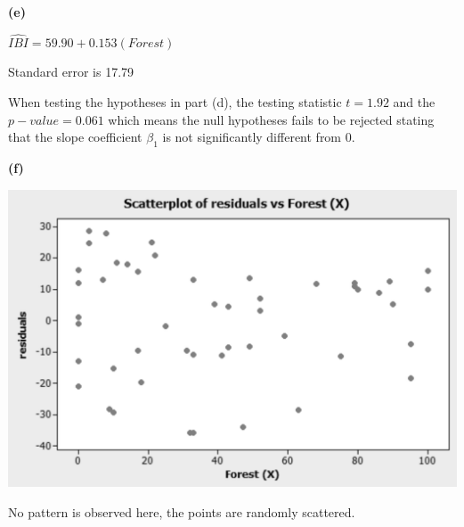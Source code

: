 \documentclass[11pt]{article}
\renewcommand\part[1]{\vspace{.10in}\textbf{(#1)}\par}
\begin{document}
	\part{e}
		$\hat{IBI}=59.90 + 0.153(Forest)$\par
		Standard error is 17.79\par
		When testing the hypotheses in part (d), the testing statistic $t=1.92$ and the $p-value=0.061$ which means the null hypotheses fails to be rejected stating that the slope coefficient $\beta_{1}$ is not significantly different from 0.\par
		
	\part{f}
		\begin{center}
			\includegraphics[scale=0.5]{images/ah2.png}
		\end{center}\par
		No pattern is observed here, the points are randomly scattered.\par
		
\end{document}
